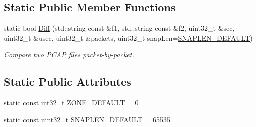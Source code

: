 \subsection*{Static Public Member Functions}
\begin{DoxyCompactItemize}
\item 
static bool \hyperlink{classns3_1_1PcapFile_a2819d3aa000846e3527b8c798a67598c}{Diff} (std\+::string const \&f1, std\+::string const \&f2, uint32\+\_\+t \&sec, uint32\+\_\+t \&usec, uint32\+\_\+t \&packets, uint32\+\_\+t snap\+Len=\hyperlink{classns3_1_1PcapFile_ac5fda3d19b0cd0f85b0c151c2397681b}{S\+N\+A\+P\+L\+E\+N\+\_\+\+D\+E\+F\+A\+U\+LT})
\begin{DoxyCompactList}\small\item\em Compare two P\+C\+AP files packet-\/by-\/packet. \end{DoxyCompactList}\end{DoxyCompactItemize}
\subsection*{Static Public Attributes}
\begin{DoxyCompactItemize}
\item 
static const int32\+\_\+t \hyperlink{classns3_1_1PcapFile_abd695588f972dc80b0c928aeda466dc0}{Z\+O\+N\+E\+\_\+\+D\+E\+F\+A\+U\+LT} = 0
\item 
static const uint32\+\_\+t \hyperlink{classns3_1_1PcapFile_ac5fda3d19b0cd0f85b0c151c2397681b}{S\+N\+A\+P\+L\+E\+N\+\_\+\+D\+E\+F\+A\+U\+LT} = 65535
\end{DoxyCompactItemize}
